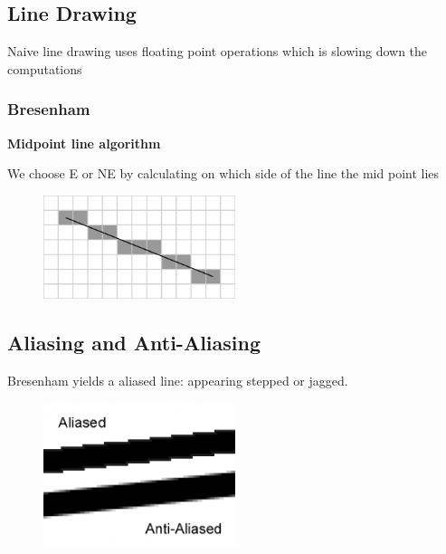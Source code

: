 \documentclass{mini}
\begin{document}
\subsection{Line Drawing}

Naive line drawing uses floating point operations which is slowing down the computations

\subsubsection{Bresenham}
{\bf Midpoint line algorithm}

We choose E or NE by calculating on which side of the line the mid point lies

\begin{figure}[H]
    \centering
    \includegraphics[width=0.5\textwidth]{./images/bresenham.png}
    \caption{}
    \label{fig:bresenham}
\end{figure}


\subsection{Aliasing and Anti-Aliasing}

Bresenham yields a aliased line: appearing stepped or jagged.

\begin{figure}[H]
    \centering
    \includegraphics[width=0.5\textwidth]{./images/aliasing.png}
    \caption{}
    \label{fig:aliasing}
\end{figure}
\end{document}
